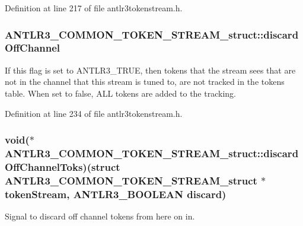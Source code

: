 Definition at line 217 of file antlr3tokenstream.\-h.

\hypertarget{struct_a_n_t_l_r3___c_o_m_m_o_n___t_o_k_e_n___s_t_r_e_a_m__struct_acafcfb5efa9233c6f5b51a48b81d3eb2}{
\subsubsection[{discard\-Off\-Channel}]{ A\-N\-T\-L\-R3\-\_\-\-C\-O\-M\-M\-O\-N\-\_\-\-T\-O\-K\-E\-N\-\_\-\-S\-T\-R\-E\-A\-M\-\_\-struct\-::discard\-Off\-Channel}}\label{struct_a_n_t_l_r3___c_o_m_m_o_n___t_o_k_e_n___s_t_r_e_a_m__struct_acafcfb5efa9233c6f5b51a48b81d3eb2}
If this flag is set to A\-N\-T\-L\-R3\-\_\-\-T\-R\-U\-E, then tokens that the stream sees that are not in the channel that this stream is tuned to, are not tracked in the tokens table. When set to false, A\-L\-L tokens are added to the tracking. 

Definition at line 234 of file antlr3tokenstream.\-h.

\hypertarget{struct_a_n_t_l_r3___c_o_m_m_o_n___t_o_k_e_n___s_t_r_e_a_m__struct_aa851d1b2d1d1e28c84e988ac92972a30}{
\subsubsection[{discard\-Off\-Channel\-Toks}]{\setlength{\rightskip}{0pt plus 5cm}void($\ast$ A\-N\-T\-L\-R3\-\_\-\-C\-O\-M\-M\-O\-N\-\_\-\-T\-O\-K\-E\-N\-\_\-\-S\-T\-R\-E\-A\-M\-\_\-struct\-::discard\-Off\-Channel\-Toks)(struct {\bf A\-N\-T\-L\-R3\-\_\-\-C\-O\-M\-M\-O\-N\-\_\-\-T\-O\-K\-E\-N\-\_\-\-S\-T\-R\-E\-A\-M\-\_\-struct} $\ast$token\-Stream, {\bf A\-N\-T\-L\-R3\-\_\-\-B\-O\-O\-L\-E\-A\-N} discard)}}\label{struct_a_n_t_l_r3___c_o_m_m_o_n___t_o_k_e_n___s_t_r_e_a_m__struct_aa851d1b2d1d1e28c84e988ac92972a30}
Signal to discard off channel tokens from here on in. 

